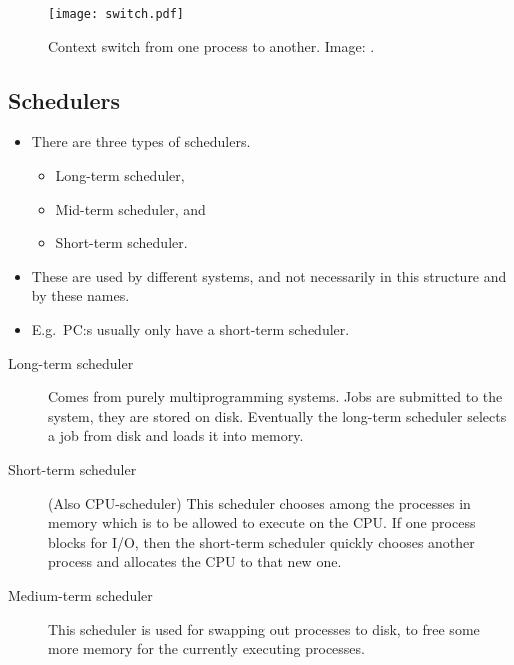 \documentclass{beamer}
\begin{document}
\begin{frame}{\insertsubsectionhead}
  \begin{figure}
    \texttt{[image: switch.pdf]}
    \caption{Context switch from one process to another.
      Image: \cite{Silberschatz2009osc}.}
  \end{figure}
\end{frame}

\subsection{Schedulers}

\begin{frame}{\insertsubsectionhead}
  \begin{itemize}
    \item There are three types of schedulers.
      \begin{itemize}
        \item Long-term scheduler,
        \item Mid-term scheduler, and
        \item Short-term scheduler.
      \end{itemize}

    \item These are used by different systems, and not necessarily in this 
      structure and by these names.

    \item E.g.\ PC:s usually only have a short-term scheduler.
  \end{itemize}
\end{frame}

\begin{frame}{\insertsubsectionhead}
  \begin{description}
    \item[Long-term scheduler] Comes from purely multiprogramming systems.
      Jobs are submitted to the system, they are stored on disk.
      Eventually the long-term scheduler selects a job from disk and loads it 
      into memory.

    \item[Short-term scheduler] (Also CPU-scheduler) This scheduler chooses 
      among the processes in memory which is to be allowed to execute on the 
      CPU.
      If one process blocks for I/O, then the short-term scheduler quickly 
      chooses another process and allocates the CPU to that new one.

    \item[Medium-term scheduler] This scheduler is used for swapping out 
      processes to disk, to free some more memory for the currently executing 
      processes.
  \end{description}
\end{frame}
\end{document}
